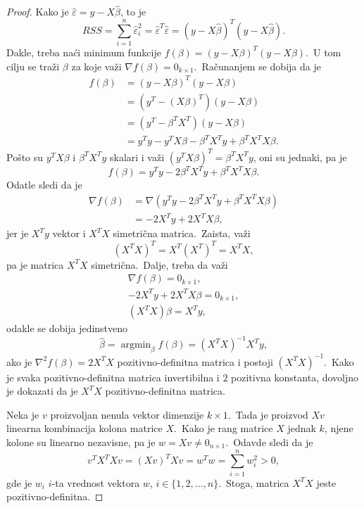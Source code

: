 \documentclass[12pt,a4paper,titlepage,oneside]{article}
\numberwithin{equation}{section}
\numberwithin{figure}{section}
\numberwithin{table}{section}
\theoremstyle{definition}
\theoremstyle{remark}
\DeclareMathOperator*{\argmin}{argmin}
\begin{document}
\begin{appendices}
\begin{proof}
	Kako je $\hat{\varepsilon} = y - X\hat{\beta}$, to je \[RSS = \sum\limits_{i = 1}^{n} \hat{\varepsilon}^2_i = \hat{\varepsilon}^T \hat{\varepsilon} = (y - X\hat{\beta})^T (y - X\hat{\beta}).\] Dakle, treba naći minimum funkcije $f(\beta ) = (y - X\beta)^T (y - X\beta)$.\ U tom cilju se traži $\beta$ za koje važi $\nabla f(\beta ) = 0_{k\times 1}$.\ Računanjem se dobija da je
	\begin{align*}
	f(\beta ) &= (y - X\beta)^T (y - X\beta)\\
	&= (y^T - (X\beta)^T ) (y - X\beta)\\
	&= (y^T - \beta^T X^T ) (y - X\beta)\\
	&= y^T y - y^T X\beta - \beta^T X^T y + \beta^T X^T X\beta .
	\end{align*}
	Pošto su $y^T X\beta$ i $\beta^T X^T y$ skalari i važi $(y^T X\beta )^T = \beta^T X^T y$, oni su jednaki, pa je \[f(\beta ) = y^T y - 2\beta^T X^T y + \beta^T X^T X\beta .\] Odatle sledi da je
	\begin{align*}
	\nabla f(\beta ) &= \nabla(y^T y - 2\beta^T X^T y + \beta^T X^T X\beta )\\
	&= - 2 X^T y + 2 X^T X\beta,
	\end{align*}
	jer je $X^T y$ vektor i $X^T X$ simetrična matrica.\ Zaista, važi \[(X^T X)^ T = X^T (X^T)^T = X^T X ,\] pa je matrica $X^T X$ simetrična.\ Dalje, treba da važi
	\begin{gather*}
	\nabla f(\beta ) = 0_{k\times 1},\\
	-2 X^T y + 2X^T X\beta = 0_{k\times 1},\\
	(X^T X)\beta = X^T y ,
	\end{gather*}
	odakle se dobija jedinstveno \[\hat{\beta} = \argmin_{\beta} f(\beta ) = (X^T X)^{-1} X^T y,\] ako je $\nabla^2 f(\beta ) = 2 X^T X$ pozitivno-definitna matrica i postoji $(X^T X)^{-1}$.\ Kako je svaka pozitivno-definitna matrica invertibilna i $2$ pozitivna konstanta, dovoljno je dokazati da je $X^T X$ pozitivno-definitna matrica.
	
	Neka je $v$ proizvoljan nenula vektor dimenzije $k\times 1$.\ Tada je proizvod $X v$ linearna kombinacija kolona matrice $X$.\ Kako je rang matrice $X$ jednak $k$, njene kolone su linearno nezavisne, pa je $w = X v\neq 0_{n\times 1}$.\ Odavde sledi da je \[v^T X^T X v = (X v)^T X v = w^T w = \sum\limits_{i = 1}^{n} w^2_i > 0,\] gde je $w_i$ $i$-ta vrednost vektora $w$, $i\in \lbrace 1, 2, \dots , n\rbrace$.\ Stoga, matrica $X^T X$ jeste pozitivno-definitna.
\end{proof}


\end{appendices}
\end{document}
